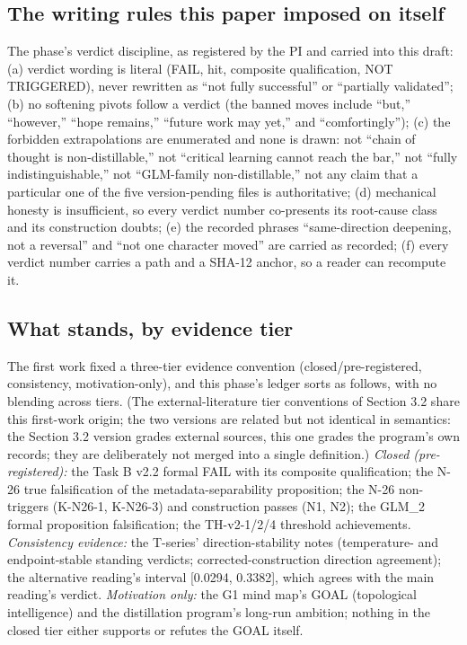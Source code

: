 \documentclass[11pt]{article}
\begin{document}
\subsection{The writing rules this paper imposed on itself}
\noindent The phase's verdict discipline, as registered by the PI and carried into this draft: (a) verdict wording is literal (FAIL, hit, composite qualification, NOT TRIGGERED), never rewritten as ``not fully successful'' or ``partially validated''; (b) no softening pivots follow a verdict (the banned moves include ``but,'' ``however,'' ``hope remains,'' ``future work may yet,'' and ``comfortingly''); (c) the forbidden extrapolations are enumerated and none is drawn: not ``chain of thought is non-distillable,'' not ``critical learning cannot reach the bar,'' not ``fully indistinguishable,'' not ``GLM-family non-distillable,'' not any claim that a particular one of the five version-pending files is authoritative; (d) mechanical honesty is insufficient, so every verdict number co-presents its root-cause class and its construction doubts; (e) the recorded phrases ``same-direction deepening, not a reversal'' and ``not one character moved'' are carried as recorded; (f) every verdict number carries a path and a SHA-12 anchor, so a reader can recompute it.\par
\subsection{What stands, by evidence tier}
\noindent The first work fixed a three-tier evidence convention (closed/pre-registered, consistency, motivation-only), and this phase's ledger sorts as follows, with no blending across tiers. (The external-literature tier conventions of Section 3.2 share this first-work origin; the two versions are related but not identical in semantics: the Section 3.2 version grades external sources, this one grades the program's own records; they are deliberately not merged into a single definition.) \emph{Closed (pre-registered):} the Task B v2.2 formal FAIL with its composite qualification; the N-26 true falsification of the metadata-separability proposition; the N-26 non-triggers (K-N26-1, K-N26-3) and construction passes (N1, N2); the GLM\_2 formal proposition falsification; the TH-v2-1/2/4 threshold achievements. \emph{Consistency evidence:} the T-series' direction-stability notes (temperature- and endpoint-stable standing verdicts; corrected-construction direction agreement); the alternative reading's interval [0.0294, 0.3382], which agrees with the main reading's verdict. \emph{Motivation only:} the G1 mind map's GOAL (topological intelligence) and the distillation program's long-run ambition; nothing in the closed tier either supports or refutes the GOAL itself.\par
\end{document}
